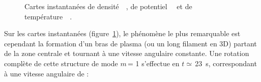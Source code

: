 \begin{refsection}
\begin{figure}[!htbp]
  \centering
    \caption{Cartes instantanées de densité~~,
    de potentiel~~ et de
    température~~.}
    \label{CybeleCartesBase}
\end{figure}

 Sur les cartes instantanées 
 (figure~\ref{CybeleCartesBase}), le phénomène le plus remarquable est
 cependant la formation d'un bras de plasma (ou un long filament en 3D) partant
 de la zone centrale et tournant à une vitesse angulaire constante.
Une rotation complète de cette structure de mode $m\,$= 1 s'effectue en
$t\simeq\,$23~\micro s, correspondant à une vitesse angulaire de :


\end{refsection}
